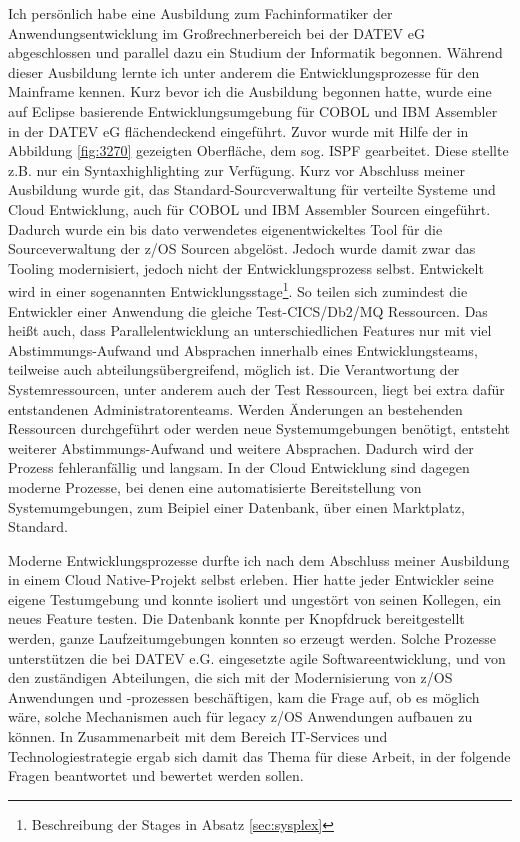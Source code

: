 Ich persönlich habe eine Ausbildung zum Fachinformatiker der Anwendungsentwicklung im Großrechnerbereich bei der DATEV eG abgeschlossen und parallel dazu ein Studium der Informatik begonnen.
Während dieser Ausbildung lernte ich unter anderem die Entwicklungsprozesse für den Mainframe kennen.
Kurz bevor ich die Ausbildung begonnen hatte, wurde eine auf Eclipse basierende Entwicklungsumgebung für COBOL und IBM Assembler in der DATEV eG flächendeckend eingeführt.
Zuvor wurde mit Hilfe der in Abbildung \ref{fig:3270} gezeigten Oberfläche, dem sog. ISPF gearbeitet.
Diese stellte z.B. nur ein Syntaxhighlighting zur Verfügung.
Kurz vor Abschluss meiner Ausbildung wurde git, das Standard-Sourcverwaltung für verteilte Systeme und Cloud Entwicklung, auch für COBOL und IBM Assembler Sourcen eingeführt.
Dadurch wurde ein bis dato verwendetes eigenentwickeltes Tool für die Sourceverwaltung der z/OS Sourcen abgelöst.
Jedoch wurde damit zwar das Tooling modernisiert, jedoch nicht der Entwicklungsprozess selbst.
Entwickelt wird in einer sogenannten \glqq Entwicklungsstage\grqq{}\footnote{Beschreibung der Stages in Absatz \ref{sec:sysplex}}. 
So teilen sich zumindest die Entwickler einer Anwendung die gleiche Test-CICS/Db2/MQ Ressourcen.
Das heißt auch, dass Parallelentwicklung an unterschiedlichen Features nur mit viel Abstimmungs-Aufwand und Absprachen innerhalb eines Entwicklungsteams, teilweise auch abteilungsübergreifend, möglich ist.
Die Verantwortung der Systemressourcen, unter anderem auch der Test Ressourcen, liegt bei extra dafür entstandenen Administratorenteams.
Werden Änderungen an bestehenden Ressourcen durchgeführt oder werden neue Systemumgebungen benötigt, entsteht weiterer Abstimmungs-Aufwand und weitere Absprachen.
Dadurch wird der Prozess fehleranfällig und langsam.
In der Cloud Entwicklung sind dagegen moderne Prozesse, bei denen eine automatisierte Bereitstellung von Systemumgebungen, zum Beipiel einer Datenbank, über einen \glqq Marktplatz\grqq, Standard. 

Moderne Entwicklungsprozesse durfte ich nach dem Abschluss meiner Ausbildung in einem \glqq Cloud Native\grqq-Projekt selbst erleben.
Hier hatte jeder Entwickler seine eigene Testumgebung und konnte isoliert und ungestört von seinen Kollegen, ein neues Feature testen.
Die Datenbank konnte per Knopfdruck bereitgestellt werden, ganze Laufzeitumgebungen konnten so erzeugt werden.
Solche Prozesse unterstützen die bei DATEV e.G. eingesetzte agile Softwareentwicklung, und von den zuständigen Abteilungen, die sich mit der Modernisierung von z/OS Anwendungen und -prozessen beschäftigen,  kam die Frage auf, ob es möglich wäre, solche Mechanismen auch für legacy z/OS Anwendungen aufbauen zu können.
In Zusammenarbeit mit dem Bereich IT-Services und Technologiestrategie ergab sich damit das Thema für diese Arbeit, in der folgende Fragen beantwortet und bewertet werden sollen.

